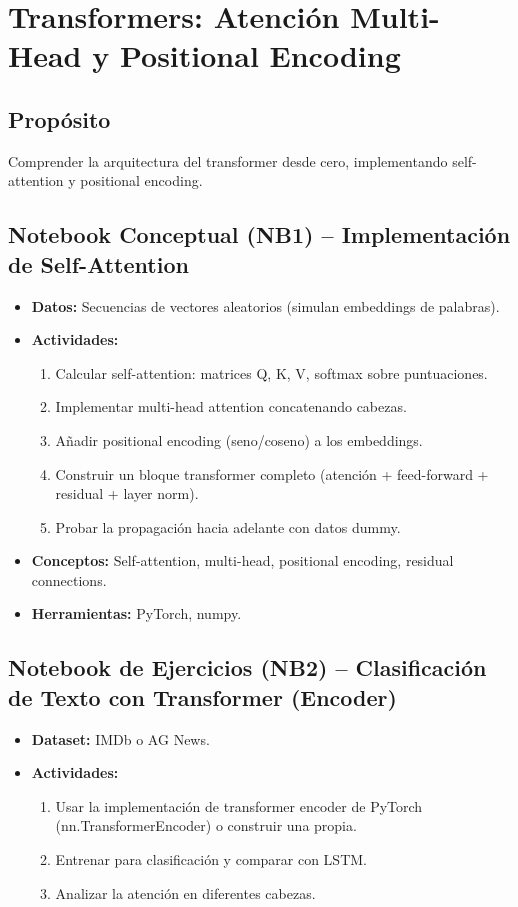 \documentclass[12pt,a4paper]{article}
\begin{document}
\section{Transformers: Atención Multi-Head y Positional Encoding}
\subsection*{Propósito}
Comprender la arquitectura del transformer desde cero, implementando self-attention y positional encoding.

\subsection*{Notebook Conceptual (NB1) – Implementación de Self-Attention}
\begin{itemize}
    \item \textbf{Datos:} Secuencias de vectores aleatorios (simulan embeddings de palabras).
    \item \textbf{Actividades:}
    \begin{enumerate}
        \item Calcular self-attention: matrices Q, K, V, softmax sobre puntuaciones.
        \item Implementar multi-head attention concatenando cabezas.
        \item Añadir positional encoding (seno/coseno) a los embeddings.
        \item Construir un bloque transformer completo (atención + feed-forward + residual + layer norm).
        \item Probar la propagación hacia adelante con datos dummy.
    \end{enumerate}
    \item \textbf{Conceptos:} Self-attention, multi-head, positional encoding, residual connections.
    \item \textbf{Herramientas:} PyTorch, numpy.
\end{itemize}

\subsection*{Notebook de Ejercicios (NB2) – Clasificación de Texto con Transformer (Encoder)}
\begin{itemize}
    \item \textbf{Dataset:} IMDb o AG News.
    \item \textbf{Actividades:}
    \begin{enumerate}
        \item Usar la implementación de transformer encoder de PyTorch (nn.TransformerEncoder) o construir una propia.
        \item Entrenar para clasificación y comparar con LSTM.
        \item Analizar la atención en diferentes cabezas.
    \end{enumerate}
\end{itemize}
\end{document}
